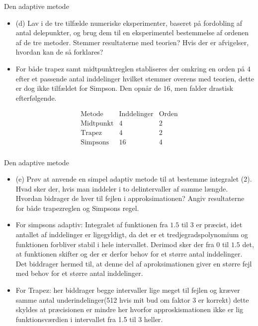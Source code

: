 \begin{frame}{Den adaptive metode}
    \begin{itemize}
        \item (d) Lav i de tre tilfælde numeriske eksperimenter, baseret på fordobling af antal delepunkter, og brug dem til en eksperimentel bestemmelse af ordenen af de tre metoder. 
        Stemmer resultaterne med teorien? Hvis der er afvigelser, hvordan kan
        de så forklares?
        \item For både trapez samt midtpunktreglen stabliseres der omkring en orden på $4$ efter et passende antal inddelinger hvilket stemmer overens med teorien, dette er dog ikke tilfældet for Simpson. Den opnår de $16$, men falder drastisk efterfølgende.
    \end{itemize}
    
$$\begin{array}{l|c|c}
\text{Metode} & \text{Inddelinger}& \text{Orden} \\
\hline
\text{Midtpunkt}	& 4		& 2 \\
\text{Trapez}		& 4		& 2 \\
\text{Simpsons}		& 16	& 4 \\
\end{array}$$
\end{frame}


\begin{frame}{Den adaptive metode}
    \begin{itemize}
        \item (e) Prøv at anvende en simpel adaptiv metode til at bestemme integralet (2). 
        Hvad sker der, hvis man inddeler i to delintervaller af samme længde. 
        Hvordan bidrager de hver til fejlen i approksimationen? 
        Angiv resultaterne for både trapezreglen og Simpsons regel.
        \item For simpsons adaptiv: Integralet af funktionen fra $1.5$ til $3$ er præcist, idet antallet af inddelinger er ligegyldigt, da det er et tredjegradspolynomium og funktionen forbliver stabil i hele intervallet. 
        Derimod sker der fra $0$ til $1.5$ det, at funktionen skifter og der er derfor behov for et større antal inddelinger. 
        Det biddrager hermed til, at denne del af aproksimationen giver en større fejl med behov for et større antal inddelinger.
        \item For Trapez: her biddrager begge intervaller lige meget til fejlen og kræver samme antal underindelinger(512 hvis mit bud om faktor 3 er korrekt) dette skyldes at præcisionen er mindre her hvorfor approskismationen ikke er lig funktionsværdien i intervallet fra 1.5 til 3 heller.
    \end{itemize}
\end{frame}